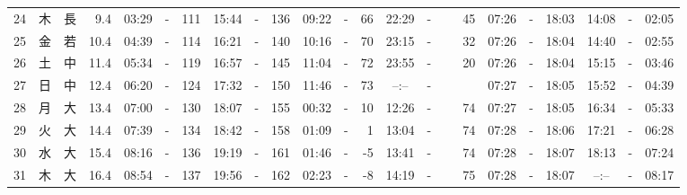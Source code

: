 \documentclass[12pt,a4j]{jsarticle}
\begin{document}
\begin{table}[htbp]
\begin{center}
{\begin{tabular}{|rc|cr|ccrccr|ccrccr|ccc|ccc|}
24 & 木 & 長 &  9.4 &  03:29 &-& 111 &  15:44 &-& 136 &  09:22 &-&  66 &  22:29 &-&  45 & 07:26 & -& 18:03 & 14:08 & -& 02:05 \\
25 & 金 & 若 & 10.4 &  04:39 &-& 114 &  16:21 &-& 140 &  10:16 &-&  70 &  23:15 &-&  32 & 07:26 & -& 18:04 & 14:40 & -& 02:55 \\
26 & 土 & 中 & 11.4 &  05:34 &-& 119 &  16:57 &-& 145 &  11:04 &-&  72 &  23:55 &-&  20 & 07:26 & -& 18:04 & 15:15 & -& 03:46 \\
27 & 日 & 中 & 12.4 &  06:20 &-& 124 &  17:32 &-& 150 &  11:46 &-&  73 &  --:-- &-&~~~~~ & 07:27 & -& 18:05 & 15:52 & -& 04:39 \\
28 & 月 & 大 & 13.4 &  07:00 &-& 130 &  18:07 &-& 155 &  00:32 &-&  10 &  12:26 &-&  74 & 07:27 & -& 18:05 & 16:34 & -& 05:33 \\
29 & 火 & 大 & 14.4 &  07:39 &-& 134 &  18:42 &-& 158 &  01:09 &-&   1 &  13:04 &-&  74 & 07:28 & -& 18:06 & 17:21 & -& 06:28 \\
30 & 水 & 大 & 15.4 &  08:16 &-& 136 &  19:19 &-& 161 &  01:46 &-&  -5 &  13:41 &-&  74 & 07:28 & -& 18:07 & 18:13 & -& 07:24 \\
31 & 木 & 大 & 16.4 &  08:54 &-& 137 &  19:56 &-& 162 &  02:23 &-&  -8 &  14:19 &-&  75 & 07:28 & -& 18:07 & --:-- & -& 08:17 \\
   \hline
   \end{tabular}}
   \end{center}
\end{table}
\newpage
\end{document}
